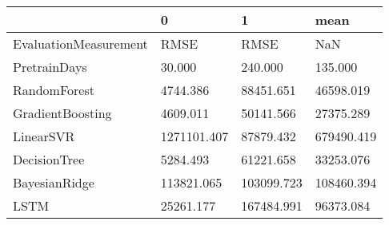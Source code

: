 \begin{tabular}{llll}
\toprule
{} &            0 &           1 &        mean \\
\midrule
EvaluationMeasurement &         RMSE &        RMSE &         NaN \\
PretrainDays          &       30.000 &     240.000 &     135.000 \\
RandomForest          &     4744.386 &   88451.651 &   46598.019 \\
GradientBoosting      &     4609.011 &   50141.566 &   27375.289 \\
LinearSVR             &  1271101.407 &   87879.432 &  679490.419 \\
DecisionTree          &     5284.493 &   61221.658 &   33253.076 \\
BayesianRidge         &   113821.065 &  103099.723 &  108460.394 \\
LSTM                  &    25261.177 &  167484.991 &   96373.084 \\
\bottomrule
\end{tabular}
